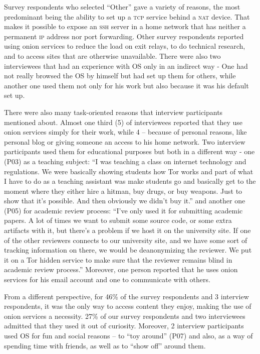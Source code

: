 Survey respondents who selected ``Other'' gave a variety of reasons, the most
predominant being the ability to set up a \textsc{tcp} service behind a
\textsc{nat} device.  That makes it possible to expose an \textsc{ssh} server in
a home network that has neither a permanent \textsc{ip} address nor port
forwarding.  Other survey respondents reported using onion services to reduce the load on exit relays, to do
technical research, and to access sites that are otherwise unavailable. There were also two interviewees that had an experience with OS only in an indirect way - One had not really browsed the OS by himself but had set up them for others, while another one used them not only for his work but also because it was his default set up.


There were also many task-oriented reasons that interview participants mentioned about. Almost one third (5) of interviewees reported that they use onion services simply for their work, while 4 – because of personal reasons, like personal blog or giving someone an access to his home network. Two interview participants used them for educational purposes but both in a different way - one (P03) as a teaching subject: “I was teaching a class on internet technology and regulations. We were basically showing students how Tor works and part of what I have to do as a teaching assistant was make students go and basically get to the moment where they either hire a hitman, buy drugs, or buy weapons. Just to show that it's possible. And then obviously we didn't buy it.” and another one (P05) for academic review process: “I've only used it for submitting academic papers. A lot of times we want to submit some source code, or some extra artifacts with it, but there's a problem if we host it on the university site. If one of the other reviewers connects to our university site, and we have some sort of tracking information on there, we would be deanonymizing the reviewer. We put it on a Tor hidden service to make sure that the reviewer remains blind in academic review process.” Moreover, one person reported that he uses onion services for his email account and one to communicate with others.

From a different perspective, for 46\% of the survey respondents and 3 interview respondents, it was the only way to access content they enjoy, making the use of
onion services a necessity. 27\% of our survey respondents and two interviewees admitted that they used it out of
curiosity. Moreover, 2 interview participants used OS for fun and social reasons – to “toy around” (P07) and also, as a way of spending time with friends, as well as to “show off” around them. 
 
